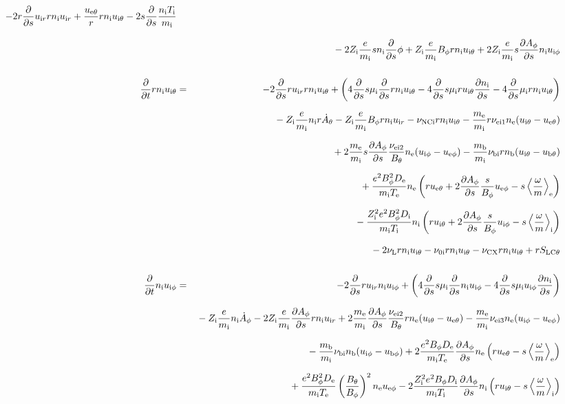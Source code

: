 \documentclass[11pt]{article}
\def\r#1{{\rm#1}}
\def\ddt{\frac{\partial}{\partial t}}
\def\dds{\frac{\partial}{\partial s}}
\def\dd#1{\frac{\partial #1}{\partial s}}
\def\ave#1{\left\langle#1\right\rangle}
\def\me{m_\r{e}}
\def\mi{m_\r{i}}
\def\mb{m_\r{b}}
\def\mui{\mu_\r{i}}
\def\De{D_\r{e}}
\def\Di{D_\r{i}}
\def\ne{n_\r{e}}
\def\ni{n_\r{i}}
\def\nb{n_\r{b}}
\def\uir{u_{\r{i}r}}
\def\ueth{u_{\r{e}\theta}}
\def\uith{u_{\r{i}\theta}}
\def\ubth{u_{\r{b}\theta}}
\def\ueph{u_{\r{e}\phi}}
\def\uiph{u_{\r{i}\phi}}
\def\ubph{u_{\r{b}\phi}}
\def\Bth{B_\theta}
\def\Bph{B_\phi}
\def\Athd{\dot{A}_\theta}
\def\Aphd{\dot{A}_\phi}
\def\Aph{A_\phi}
\def\Te{T_\r{e}}
\def\Ti{T_\r{i}}
\def\Zi{Z_\r{i}}
\def\nuNCi{\nu_\r{NCi}}
\def\nubi{\nu_\r{bi}}
\def\nuni{\nu_\r{0i}}
\def\nuL{\nu_\r{L}}
\def\nuCX{\nu_\r{CX}}
\begin{document}
\begin{eqnarray}
%
  - 2 r \dds \uir r \ni \uir
%
  + \frac{\ueth}{r} r \ni \uith
%
  - 2 s \dds \frac{\ni \Ti}{\mi}
\nonumber\\[3mm]&&{}
%
  - 2 \Zi \frac{e}{\mi} s \ni \dds \phi
%
  + \Zi \frac{e}{\mi} \Bph r \ni \uith
%
  + 2 \Zi \frac{e}{\mi} s \dd{\Aph} \ni \uiph
\\[5mm]
%
%
  \ddt r \ni \uith &=&
%
  - 2 \dds r \uir r \ni \uith
%
  + \left(   4 \dds s \mui \dds r \ni \uith
%
           - 4 \dds s \mui r \uith \dd{\ni}
%
	   - 4 \dds \mui r \ni \uith \right)
\nonumber\\[2.5mm]&&{}
%
  - \Zi \frac{e}{\mi} \ni r \Athd
%
  - \Zi \frac{e}{\mi} \Bph r \ni \uir
%
  - \nuNCi r \ni \uith
%
  - \frac{\me}{\mi} r \nu_\r{ei1} \ne (\uith - \ueth)
\nonumber\\[2.5mm]&&{}
%
  + 2 \frac{\me}{\mi} s \dd{\Aph} \frac{\nu_\r{ei2}}{\Bth} \ne (\uiph - \ueph)
%
  - \frac{\mb}{\mi} \nubi r \nb (\uith - \ubth)
\nonumber\\[2.5mm]&&{}
%
  + \frac{e^2 \Bph^2 \De}{\mi\Te}\ne
    \left(r \ueth + 2\dd{\Aph}\frac{s}{\Bph}\ueph - s
     \ave{\frac{\omega}{m}}_\r{e} \right)
\nonumber\\[2.5mm]&&{}
%
  - \frac{\Zi^2 e^2 \Bph^2 \Di}{\mi\Ti}\ni
    \left(r \uith + 2\dd{\Aph}\frac{s}{\Bph}\uiph - s
     \ave{\frac{\omega}{m}}_\r{i} \right)
\nonumber\\[2.5mm]&&{}
%
  - 2 \nuL r \ni \uith
%
  - \nuni r \ni \uith
%
  - \nuCX r \ni \uith
%
  + r S_\r{LC\theta}
%
%
\\[5mm]
%
%
  \ddt \ni \uiph &=&
%
  - 2 \dds r \uir \ni \uiph
%
  + \left(   4 \dds s \mui \dds \ni \uiph
%
           - 4 \dds s \mui \uiph \dd{\ni} \right)
\nonumber\\[2.5mm]&&{}
%
  - \Zi \frac{e}{\mi} \ni \Aphd
%
  - 2 \Zi \frac{e}{\mi} \dd{\Aph} r \ni \uir 
%
  + 2 \frac{\me}{\mi} \dd{\Aph} \frac{\nu_\r{ei2}}{\Bth} r \ne (\uith - \ueth)
%
  - \frac{\me}{\mi} \nu_\r{ei3} \ne (\uiph - \ueph)
\nonumber\\[2.5mm]&&{}
%
  - \frac{\mb}{\mi} \nubi \nb (\uiph - \ubph)
%
  + 2\frac{e^2 \Bph \De}{\mi\Te}\dd{\Aph}\ne
    \left(r \ueth - s \ave{\frac{\omega}{m}}_\r{e} \right)
\nonumber\\[2.5mm]&&{}
%
  + \frac{e^2 \Bph^2 \De}{\mi\Te}\left(\frac{\Bth}{\Bph}\right)^2\ne\ueph
%
  - 2\frac{\Zi^2 e^2 \Bph \Di}{\mi\Ti}\dd{\Aph}\ni
    \left(r \uith - s \ave{\frac{\omega}{m}}_\r{i} \right)
\nonumber\\[2.5mm]&&{}

\end{eqnarray}
\end{document}
